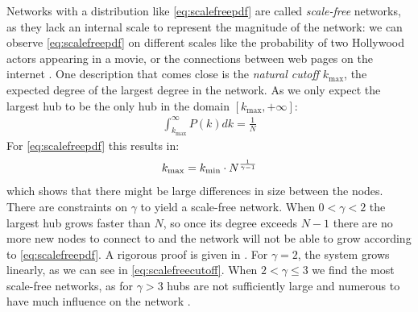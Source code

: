 Networks with a distribution like \eqref{eq:scalefreepdf} are called \textit{scale-free} networks, as they lack an internal scale to represent the magnitude of the network: we can observe \eqref{eq:scalefreepdf} on different scales like the probability of two Hollywood actors appearing in a movie, or the connections between web pages on the internet \cite{Barabasi2003}. One description that comes close is the \textit{natural cutoff} $k_{\text{max}}$, the expected degree of the largest degree in the network. As we only expect the largest hub to be the only hub in the domain $[k_{\text{max}}, +\infty]$:
\begin{align*}
\int_{k_{\text{max}}}^{\infty} P(k) dk=\frac{1}{N}
\end{align*}
For \eqref{eq:scalefreepdf} this results in:
\begin{align}
k_{\text{max}} = k_{\text{min}} \cdot N^{\frac{1}{\gamma-1}} \label{eq:scalefreecutoff}
\end{align}
which shows that there might be large differences in size between the nodes. \\
There are constraints on $\gamma$ to yield a scale-free network. When $0 < \gamma < 2$ the largest hub grows faster than $N$, so once its degree exceeds $N-1$ there are no more new nodes to connect to and the network will not be able to grow according to \eqref{eq:scalefreepdf}. A rigorous proof is given in \cite{Bassler2011}. For $\gamma = 2$, the system grows linearly, as we can see in \eqref{eq:scalefreecutoff}. When $2 < \gamma \leq 3$ we find the most scale-free networks, as for $\gamma > 3$ hubs are not sufficiently large and numerous to have much influence on the network
\cite{BarabasiNetworkBook2016}.

